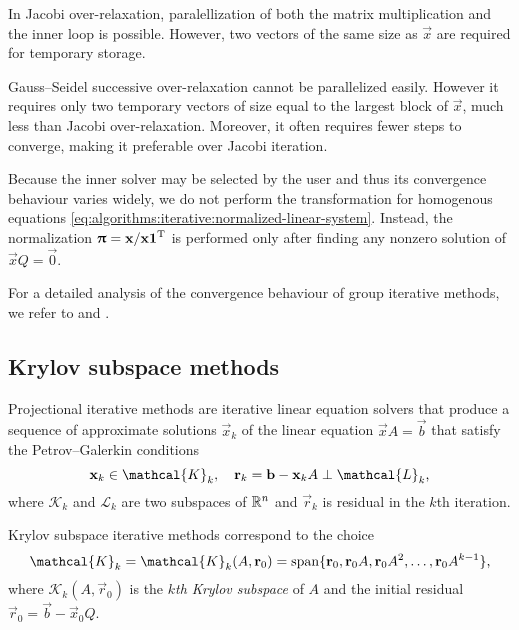 In Jacobi over-relaxation, paralellization of both the matrix
multiplication and the inner loop is possible. However, two vectors of
the same size as $\vec{x}$ are required for temporary storage.

Gauss--Seidel successive over-relaxation cannot be parallelized
easily.  However it requires only two temporary vectors of size equal
to the largest block of $\vec{x}$, much less than Jacobi
over-relaxation. Moreover, it often requires fewer steps to converge,
making it preferable over Jacobi iteration.

Because the inner solver may be selected by the user and thus its
convergence behaviour varies widely, we do not perform the
transformation for homogenous equations
\eqref{eq:algorithms:iterative:normalized-linear-system}. Instead, the
normalization $\bm{\mathrm{\uppi}} = \bm{\mathrm{x}} / \bm{\mathrm{x}}\bm{\mathrm{1}}^{\mathrm{T}}$ is performed
only after finding any nonzero solution of $\vec{x} Q = \vec{0}$.

For a detailed analysis of the convergence behaviour of group
iterative methods, we refer to
\citet[Chapter~14]{greenbaum1997iterative} and
\citet{courtois1986block}.

\subsection{Krylov subspace methods}

Projectional iterative methods are iterative linear equation solvers
that produce a sequence of approximate solutions $\vec{x}_k$ of the
linear equation $\vec{x} A = \vec{b}$ that satisfy the
Petrov--Galerkin conditions~\citep[Section~5.1.1]{saad2003iterative}
\begin{equation}
  \label{eq:algorithms:krylov:galerkin}
  \vec{x}_k \in \mathcal{K}_k, \quad \vec{r}_k = \vec{b} - \vec{x}_k A
  \perp \mathcal{L}_k \text,
\end{equation}
where $\mathcal{K}_k$ and $\mathcal{L}_k$ are two subspaces of
$\mathbb{R}^n$ and $\vec{r}_k$ is residual in the $k$th iteration.

Krylov subspace iterative methods correspond to the choice
\begin{equation}
  \mathcal{K}_k = \mathcal{K}_{k}(A, \vec{r}_0) = \Span \{ \vec{r}_0,
  \vec{r}_0 A, \vec{r}_0 A^2, \ldots, \vec{r}_0 A^{k - 1} \} \text,
\end{equation}
where $\mathcal{K}_{k}(A, \vec{r}_0)$ is the \emph{$k$th Krylov
  subspace} of $A$ and the initial residual $\vec{r}_0 = \vec{b} -
\vec{x}_0 Q$.

